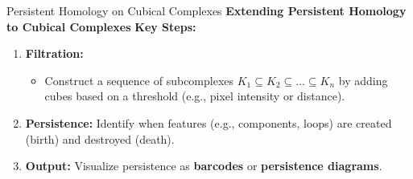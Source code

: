 \documentclass[aspectratio=169,xcolor=dvipsnames]{beamer}
\begin{document}
\begin{frame}{Persistent Homology on Cubical Complexes}
    \textbf{Extending Persistent Homology to Cubical Complexes}
    \textbf{Key Steps:}
    \begin{enumerate}
        \item \textbf{Filtration:} 
        \begin{itemize}
            \item Construct a sequence of subcomplexes \(K_1 \subseteq K_2 \subseteq \dots \subseteq K_n\) by adding cubes based on a threshold (e.g., pixel intensity or distance).
        \end{itemize}
        \item \textbf{Persistence:} Identify when features (e.g., components, loops) are created (birth) and destroyed (death).
        \item \textbf{Output:} Visualize persistence as \textbf{barcodes} or \textbf{persistence diagrams}.
    \end{enumerate}

\end{frame}
\end{document}
